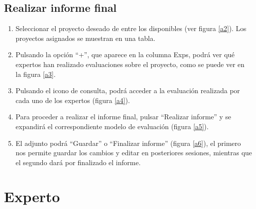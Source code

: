 \documentclass[12pt,a4paper,spanish,twoside]{book}
\begin{document}
\subsection{Realizar informe final}
\begin{enumerate}
\item Seleccionar el proyecto deseado de entre los disponibles (ver figura 
  \ref{a2}). Los proyectos asignados se muestran en una tabla.
  

\item Pulsando la opción ``+'', que aparece en la columna Exps, podrá ver qué 
  expertos han realizado evaluaciones sobre el proyecto, como se puede ver en
  la figura \ref{a3}. 


\item Pulsando el icono de consulta, podrá acceder a la evaluación realizada 
  por cada uno de los expertos (figura \ref{a4}).


\item Para proceder a realizar el informe final, pulsar ``Realizar informe'' 
  y se expandirá el correspondiente modelo de evaluación (figura \ref{a5}).
  

\item El adjunto podrá ``Guardar'' o ``Finalizar informe'' 
  (figura \ref{a6}), el primero nos permite guardar los cambios y editar en 
  posteriores sesiones, mientras que el segundo dará por finalizado el informe.
  
\end{enumerate}

\section{Experto}
\end{document}
